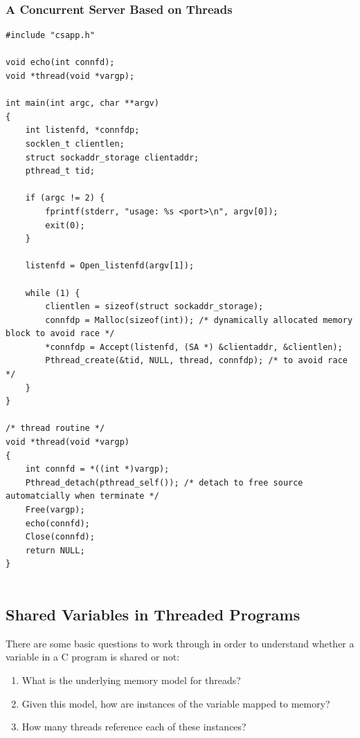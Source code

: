 \documentclass[11pt]{article}
\begin{document}
\subsubsection{A Concurrent Server Based on Threads}
\label{sec:org5c9169b}

\begin{verbatim}
#include "csapp.h"

void echo(int connfd);
void *thread(void *vargp);

int main(int argc, char **argv)
{
    int listenfd, *connfdp;
    socklen_t clientlen;
    struct sockaddr_storage clientaddr;
    pthread_t tid;

    if (argc != 2) {
        fprintf(stderr, "usage: %s <port>\n", argv[0]);
        exit(0);
    }

    listenfd = Open_listenfd(argv[1]);

    while (1) {
        clientlen = sizeof(struct sockaddr_storage);
        connfdp = Malloc(sizeof(int)); /* dynamically allocated memory block to avoid race */
        *connfdp = Accept(listenfd, (SA *) &clientaddr, &clientlen);
        Pthread_create(&tid, NULL, thread, connfdp); /* to avoid race */
    }
}

/* thread routine */
void *thread(void *vargp)
{
    int connfd = *((int *)vargp);
    Pthread_detach(pthread_self()); /* detach to free source automatcially when terminate */
    Free(vargp);
    echo(connfd);
    Close(connfd);
    return NULL;
}


\end{verbatim}

\subsection{Shared Variables in Threaded Programs}
\label{sec:org7c64999}

There are some basic questions to work through in order to understand whether a variable in a C program is shared or not:\\
\begin{enumerate}
\item What is the underlying memory model for threads?\\
\item Given this model, how are instances of the variable mapped to memory?\\
\item How many threads reference each of these instances?\\
\end{enumerate}
\end{document}

